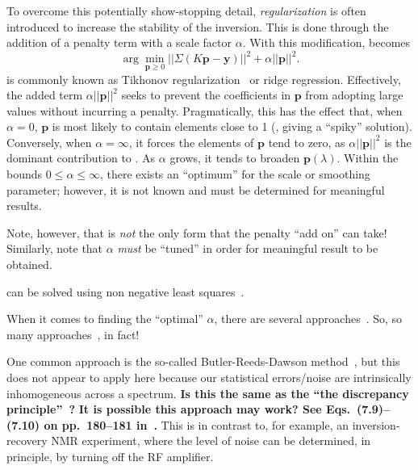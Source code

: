 To overcome this potentially show-stopping detail, \emph{regularization} is often introduced to increase the stability of the inversion.
This is done through the addition of a penalty term with a scale factor $\alpha$.
With this modification,  becomes
%
\begin{equation}
\label{eq:rnnls}
   \arg \min_{\mathbf{p} \geq 0} || \Sigma(K \mathbf{p} - \mathbf{y}) ||^{2} + \alpha || \mathbf{p} ||^{2} .
\end{equation}
%
 is commonly known as Tikhonov regularization~\cite{1995-Tikhonov-NMSIPP} or ridge regression.
Effectively, the added term $\alpha || \mathbf{p} ||^{2}$ seeks to prevent the coefficients in $\mathbf{p}$ from adopting large values without incurring a penalty.
Pragmatically, this has the effect that, when $\alpha = 0$, $\mathbf{p}$ is most likely to contain elements close to 1 (, giving a ``spiky'' solution).
Conversely, when $\alpha = \infty$, it forces the elements of $\mathbf{p}$ tend to zero, as $\alpha || \mathbf{p} ||^{2}$ is the dominant contribution to .
As $\alpha$ grows, it tends to broaden $\mathbf{p}(\lambda)$.
Within the bounds $0 \leq \alpha \leq \infty$, there exists an ``optimum'' for the scale or smoothing parameter;
however, it is not known  and must be determined for meaningful results.




Note, however, that  is \emph{not} the only form that the penalty ``add on'' can take!
Similarly, note that $\alpha$ \emph{must} be ``tuned'' in order for meaningful result to be obtained.


 can be solved using non negative least squares~\cite{1995-Lawson-SLSP}.



When it comes to finding the ``optimal'' $\alpha$, there are several approaches~\cite{2001-Kilmer-SIAMJMAA-22-1204}.
So, so many approaches~\cite{2011-Bauer-MCS-81-1795}, in fact!


One common approach is the so-called Butler-Reeds-Dawson method~\cite{1981-Butler-SIAMJNMA-18-381}, but this does not appear to apply here because our statistical errors/noise are intrinsically inhomogeneous across a spectrum.
\textbf{Is this the same as the ``the discrepancy principle''~\cite{1966-Morozon-DANSSR-167-510}?}
\textbf{It is possible this approach may work? See Eqs.~(7.9)--(7.10) on pp.~180--181 in~\cite{1998-Hansen-RDDIPP}.}
This is in contrast to, for example, an inversion-recovery NMR experiment, where the level of noise can be determined, in principle, by turning off the RF amplifier.



